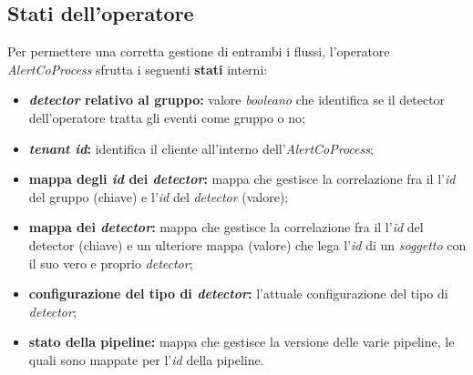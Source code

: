 \subsection{Stati dell'operatore}\label{sec:stati-alertcoprocess}
Per permettere una corretta gestione di entrambi i flussi, l'operatore \textit{AlertCoProcess} sfrutta i seguenti \textbf{stati} interni:
\begin{itemize}
		\item{\textbf{\textit{detector} relativo al gruppo:} valore \textit{booleano} che identifica se il detector dell'operatore tratta gli eventi come gruppo o no;}
		\item{\textbf{\textit{tenant id}:} identifica il cliente all'interno dell'\textit{AlertCoProcess};}
		\item{\textbf{mappa degli \textit{id} dei \textit{detector}:} mappa che gestisce la correlazione fra il l'\textit{id} del gruppo (chiave) e l'\textit{id} del \textit{detector} (valore);}
		\item{\textbf{mappa dei \textit{detector}:} mappa che gestisce la correlazione fra il l'\textit{id} del detector (chiave) e un ulteriore mappa (valore) che lega l'\textit{id} di un \textit{soggetto} con il suo vero e proprio \textit{detector};}
		\item{\textbf{configurazione del tipo di \textit{detector}:} l'attuale configurazione del tipo di \textit{detector};}
		\item{\textbf{stato della \gls{pipeline}:} mappa che gestisce la versione delle varie \gls{pipeline}, le quali sono mappate per l'\textit{id} della \gls{pipeline}.}
\end{itemize}

